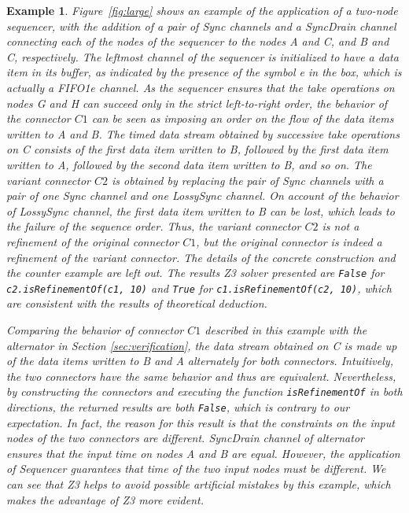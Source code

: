 \documentclass[preprint,3p]{elsarticle}
\newtheorem{example}{Example}[section]
\begin{document}
\begin{example}
Figure~\ref{fig:large} shows an example of the application of a two-node sequencer, with the addition of a pair of \emph{Sync} channels and a \emph{SyncDrain} channel connecting each of the nodes of the sequencer to the nodes
\emph{A} and \emph{C}, and \emph{B} and \emph{C}, respectively. The leftmost channel of the sequencer is initialized to have a data item in its buffer, as indicated by the presence of the symbol \emph{e} in the box, which is actually a \emph{FIFO1e} channel. As the sequencer ensures that the take operations on nodes \emph{G} and \emph{H} can succeed only in the strict left-to-right order, the behavior of the connector $C1$ can be seen as imposing an order on the flow of the data items written to \emph{A} and \emph{B}. The timed data stream obtained by successive take operations on \emph{C} consists of the first data item written to \emph{B}, followed by the first data item written to \emph{A}, followed by the second data item written to \emph{B}, and so on. The variant connector $C2$ is obtained by replacing the pair of \emph{Sync} channels with a pair of one \emph{Sync} channel and one \emph{LossySync} channel. On account of the behavior of \emph{LossySync} channel, the first data item written to \emph{B} can be lost, which leads to the failure of the sequence order. Thus, the variant connector $C2$ is not a refinement of the original connector $C1$, but the original connector is indeed a refinement of the variant connector. The details of the concrete construction and the counter example are left out. The results Z3 solver presented are \texttt{False} for \texttt{c2.isRefinementOf(c1, 10)} and \texttt{True} for \texttt{c1.isRefinementOf(c2, 10)}, which are consistent with the results of theoretical deduction.

Comparing the behavior of connector $C1$ described in this example with the \emph{alternator} in Section \ref{sec:verification}, the data stream obtained on \emph{C} is made up of the data items written to \emph{B} and \emph{A} alternately for both connectors. Intuitively, the two connectors have the same behavior and thus are equivalent. Nevertheless, by constructing the connectors and executing the function \texttt{isRefinementOf} in both directions, the returned results are both \texttt{False}, which is contrary to our expectation. In fact, the reason for this result is that the constraints on the input nodes of the two connectors are different. \emph{SyncDrain} channel of \emph{alternator} ensures that the input time on nodes \emph{A} and \emph{B} are equal. However, the application of \emph{Sequencer} guarantees that time of the two input nodes must be different. We can see that Z3 helps to avoid possible artificial mistakes by this example, which makes the advantage of Z3 more evident.


\end{example}
\end{document}
